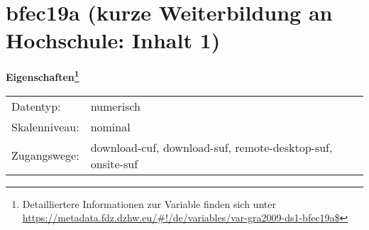 
    \setcounter{footnote}{0}

    \vspace*{-1.8cm}
	\section{bfec19a (kurze Weiterbildung an Hochschule: Inhalt 1)}
	\label{section:bfec19a}



    \vspace*{0.5cm}
    \noindent\textbf{Eigenschaften\footnote{Detailliertere Informationen zur Variable finden sich unter
		\url{https://metadata.fdz.dzhw.eu/\#!/de/variables/var-gra2009-ds1-bfec19a$}}}\\
	\begin{tabularx}{\hsize}{@{}lX}
	Datentyp: & numerisch \\
	Skalenniveau: & nominal \\
	Zugangswege: &
	  download-cuf, 
	  download-suf, 
	  remote-desktop-suf, 
	  onsite-suf
 \\
    \end{tabularx}




